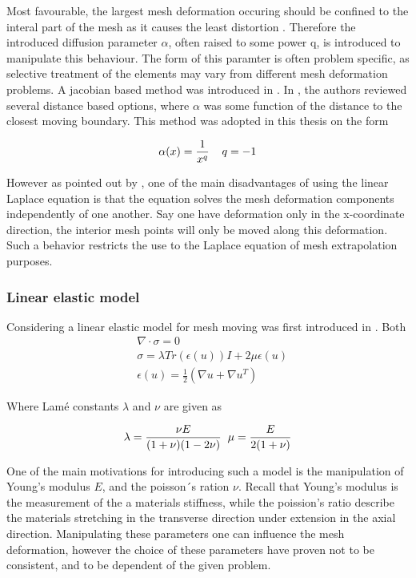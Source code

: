 Most favourable, the largest mesh deformation occuring should be confined to the interal part of the mesh as it causes the least distortion \cite{Jasak2006}. Therefore the introduced diffusion parameter $\alpha$, often raised to some power q, is introduced to manipulate this behaviour. The form of this paramter is often problem specific,  as selective treatment of the elements may vary from different mesh deformation problems. A jacobian based method was introduced in \cite{Stein}. In \cite{Jasak2006}, the authors reviewed several distance based options, where $\alpha$ was some function of the distance to the closest moving boundary. This method was adopted in this thesis on the form

\begin{align*}
\alpha(x) = \frac{1}{x^q}  \hspace{4mm} q = -1
\end{align*}

However as pointed out by \cite{Hsu}, one of the main disadvantages of using the linear Laplace equation is that the equation solves the mesh deformation components independently of one another. Say one have deformation only in the x-coordinate direction, the interior mesh points will only be moved along this deformation. Such a behavior restricts the use to the Laplace equation of mesh extrapolation purposes.

\subsubsection*{Linear elastic model}
Considering a linear elastic model for mesh moving was first introduced in \cite{Tezduyar1992}.  
Both \cite{Dwight}
\begin{align*}
&\nabla \cdot \sigma = 0 \\
&\sigma = \lambda Tr(\epsilon(u)) I + 2 \mu \epsilon(u) \\
&\epsilon(u) = \frac{1}{2}(\nabla u + \nabla  u^T)
\end{align*}

Where Lamé constants $\lambda$ and $\nu$ are given as

\begin{align*}
\lambda = \frac{\nu E}{(1 + \nu)(1 - 2\nu)} \hspace{2mm} \mu = \frac{E}{2(1 + \nu)}
\end{align*}

One of the main motivations for introducing such a model is the manipulation of Young's modulus $E$, and the poisson´s ration $\nu$. Recall that Young's modulus is the measurement of the a materials stiffness, while the poission's ratio describe the materials stretching in the transverse direction under extension in the axial direction. Manipulating these parameters one can influence the mesh deformation,
however the choice of these parameters have proven not to be consistent,  and to be dependent of the given problem.  \\

